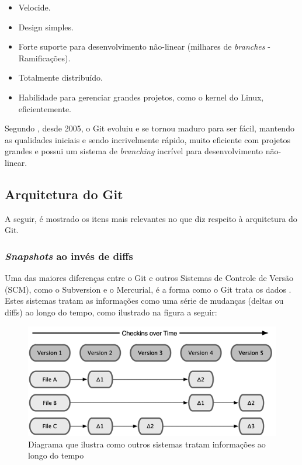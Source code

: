 \begin{itemize}
	\item Velocide.
	\item Design simples.
	\item Forte suporte para desenvolvimento não-linear (milhares de \emph{branches} - Ramificações).
	\item Totalmente distribuído.
	\item Habilidade para gerenciar grandes projetos, como o kernel do Linux, eficientemente. 
\end{itemize}


Segundo \cite{progit}, desde 2005, o Git evoluiu e se tornou maduro para ser fácil, mantendo as qualidades iniciais e sendo incrivelmente rápido, muito eficiente com projetos grandes e possui um sistema de \emph{branching} incrível para desenvolvimento não-linear.

\subsection{Arquitetura do Git}

A seguir, é mostrado os itens mais relevantes no que diz respeito à arquitetura do Git.

\subsubsection{\emph{Snapshots} ao invés de diffs}

Uma das maiores diferenças entre o Git e outros Sistemas de Controle de Versão (SCM), como o Subversion e o Mercurial, é a forma como o Git trata os dados \cite[p. 6]{progit}. Estes sistemas tratam as informações como uma série de mudanças (deltas ou diffs) ao longo do tempo, como ilustrado na figura a seguir:

\begin{figure} [ht]
	\centering
	\includegraphics[scale=0.5]{scm_delta.png}
	\caption{Diagrama que ilustra como outros sistemas tratam informações ao longo do tempo\cite[p. 6]{progit}}
	\label{scm_delta}
\end{figure}


